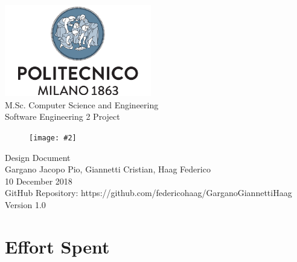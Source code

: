 \documentclass{report}
\newcommand{\image}[4]{
	\begin{figure}[H]
	\centering
	\texttt{[image: \#2]}
	\caption*{#3}
	\label{#4}

	\label{fig:nonfloat} %
	\end{figure}
}
\begin{document}
	\begin{titlepage}
		\centering	
		\vfill
		{
			\includegraphics[width =\linewidth, height = 4cm, keepaspectratio]{PolitecnicoLogo.png}
			\label{fig:PolitecnicoLogo}
			\large \\[2ex]M.Sc. Computer Science and Engineering\\
			\large Software Engineering 2 Project\\[9ex]			
			\image{5cm}{TrackMeLogo.png}{}{TrackMeLogo}
			\huge Design Document\\[4ex]

			\normalsize Gargano Jacopo Pio, Giannetti Cristian, Haag Federico\\[1.5ex]
			\normalsize 10 December 2018 \\[1.5ex]
			\normalsize GitHub Repository: https://github.com/federicohaag/GarganoGiannettiHaag\\[3ex]
			\normalsize Version 1.0
		}
		
	\end{titlepage}

	\newpage
	\tableofcontents
	\thispagestyle{fancy}
	
	\newpage
	
	
	
	
	
	
		
	\chapter{Effort Spent}
	\thispagestyle{fancy}
\end{document}

